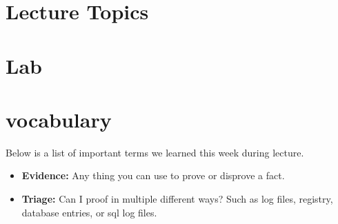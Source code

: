 \documentclass[letterpaper, onecolumn,10pt]{IEEEtran}
\begin{document}
		\section{Lecture Topics}
		
		\section{Lab}

		\section{vocabulary}
		    Below is a list of important terms we learned this week during lecture.\\
		    \begin{itemize}
		        \item \textbf{Evidence: } Any thing you can use to prove or disprove a fact.\\
		        \item \textbf{Triage: } Can I proof in multiple different ways? Such as log files, registry, database entries, or sql log files.\\
		    \end{itemize}
		
\end{document}
